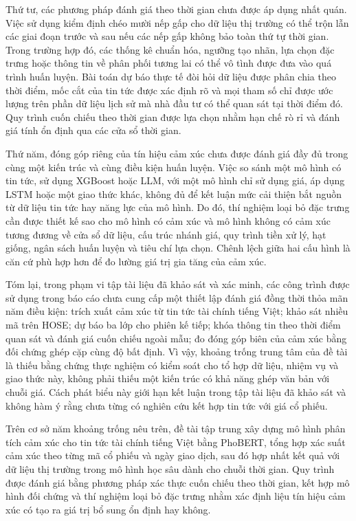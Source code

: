 \documentclass[12pt, a4paper, oneside]{report}
\begin{document}
Thứ tư, các phương pháp đánh giá theo thời gian chưa được áp dụng nhất quán. Việc
sử dụng kiểm định chéo mười nếp gấp cho dữ liệu thị trường có thể trộn lẫn các giai đoạn
trước và sau nếu các nếp gấp không bảo toàn thứ tự thời gian. Trong trường hợp đó, các thống kê
chuẩn hóa, ngưỡng tạo nhãn, lựa chọn đặc trưng hoặc thông tin về phân phối tương lai
có thể vô tình được đưa vào quá trình huấn luyện. Bài toán dự báo thực tế đòi hỏi dữ liệu
được phân chia theo thời điểm, mốc cắt của tin tức được xác định rõ và mọi tham số chỉ được
ước lượng trên phần dữ liệu lịch sử mà nhà đầu tư có thể quan sát tại thời điểm đó. Quy trình
cuốn chiếu theo thời gian được lựa chọn nhằm hạn chế rò rỉ và đánh giá tính ổn định qua
các cửa sổ thời gian.

Thứ năm, đóng góp riêng của tín hiệu cảm xúc chưa được đánh giá đầy đủ trong
cùng một kiến trúc và cùng điều kiện huấn luyện. Việc so sánh một mô hình có tin tức,
sử dụng XGBoost hoặc LLM, với một mô hình chỉ sử dụng giá, áp dụng LSTM hoặc một giao thức khác,
không đủ để kết luận mức cải thiện bắt nguồn từ dữ liệu tin tức hay năng lực của mô hình.
Do đó, thí nghiệm loại bỏ đặc trưng cần được thiết kế sao cho mô hình có cảm xúc và mô
hình không có cảm xúc tương đương về cửa sổ dữ liệu, cấu trúc nhánh giá,
quy trình tiền xử lý, hạt giống, ngân sách huấn luyện và tiêu chí lựa chọn. Chênh lệch
giữa hai cấu hình là căn cứ phù hợp hơn để đo lường giá trị gia tăng của cảm xúc.

Tóm lại, trong phạm vi tập tài liệu đã khảo sát và xác minh, các công trình được sử dụng
trong báo cáo chưa cung cấp một thiết lập đánh giá đồng thời thỏa mãn năm điều kiện:
trích xuất cảm xúc từ tin tức tài chính tiếng Việt; khảo sát nhiều mã trên HOSE; dự báo
ba lớp cho phiên kế tiếp; khóa thông tin theo thời điểm quan sát và đánh giá cuốn chiếu
ngoài mẫu; đo đóng góp biên của cảm xúc bằng đối chứng ghép cặp cùng độ bất định. Vì vậy,
khoảng trống trung tâm của đề tài là thiếu bằng chứng thực nghiệm có kiểm soát cho tổ hợp
dữ liệu, nhiệm vụ và giao thức này, không phải thiếu một kiến trúc có khả năng ghép văn
bản với chuỗi giá. Cách phát biểu này giới hạn kết luận trong tập tài liệu đã khảo sát và
không hàm ý rằng chưa từng có nghiên cứu kết hợp tin tức với giá cổ phiếu.

Trên cơ sở năm khoảng trống nêu trên, đề tài tập trung xây dựng mô hình phân tích cảm xúc
cho tin tức tài chính tiếng Việt bằng PhoBERT, tổng hợp xác suất cảm xúc theo từng mã cổ
phiếu và ngày giao dịch, sau đó hợp nhất kết quả với dữ liệu thị trường trong mô hình học sâu
dành cho chuỗi thời gian. Quy trình được đánh giá bằng phương pháp xác thực cuốn chiếu theo thời gian,
kết hợp mô hình đối chứng và thí nghiệm loại bỏ đặc trưng nhằm xác định liệu tín hiệu cảm xúc có
tạo ra giá trị bổ sung ổn định hay không.
\end{document}

